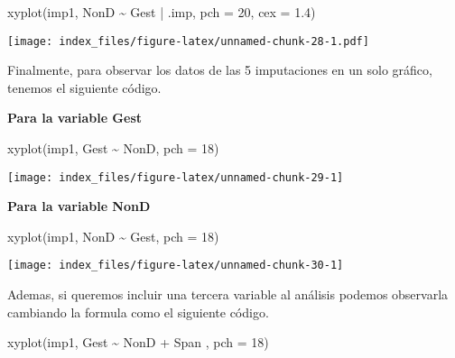 \documentclass[
]{article}
\newenvironment{Shaded}{\begin{snugshade}}{\end{snugshade}}
\newcommand{\AttributeTok}[1]{\textcolor[rgb]{0.77,0.63,0.00}{#1}}
\newcommand{\DecValTok}[1]{\textcolor[rgb]{0.00,0.00,0.81}{#1}}
\newcommand{\FloatTok}[1]{\textcolor[rgb]{0.00,0.00,0.81}{#1}}
\newcommand{\FunctionTok}[1]{\textcolor[rgb]{0.00,0.00,0.00}{#1}}
\newcommand{\NormalTok}[1]{#1}
\newcommand{\SpecialCharTok}[1]{\textcolor[rgb]{0.00,0.00,0.00}{#1}}
\begin{document}
\begin{Shaded}
\begin{Highlighting}[]
\FunctionTok{xyplot}\NormalTok{(imp1, NonD }\SpecialCharTok{\textasciitilde{}}\NormalTok{ Gest }\SpecialCharTok{|}\NormalTok{ .imp, }\AttributeTok{pch =} \DecValTok{20}\NormalTok{, }\AttributeTok{cex =} \FloatTok{1.4}\NormalTok{)}
\end{Highlighting}
\end{Shaded}

\texttt{[image: index\_files/figure-latex/unnamed-chunk-28-1.pdf]}

Finalmente, para observar los datos de las 5 imputaciones en un solo
gráfico, tenemos el siguiente código.

\textbf{Para la variable Gest}

\begin{Shaded}
\begin{Highlighting}[]
\FunctionTok{xyplot}\NormalTok{(imp1, Gest }\SpecialCharTok{\textasciitilde{}}\NormalTok{ NonD, }\AttributeTok{pch =} \DecValTok{18}\NormalTok{)}
\end{Highlighting}
\end{Shaded}

\texttt{[image: index\_files/figure-latex/unnamed-chunk-29-1]}

\textbf{Para la variable NonD}

\begin{Shaded}
\begin{Highlighting}[]
\FunctionTok{xyplot}\NormalTok{(imp1, NonD }\SpecialCharTok{\textasciitilde{}}\NormalTok{ Gest, }\AttributeTok{pch =} \DecValTok{18}\NormalTok{)}
\end{Highlighting}
\end{Shaded}

\texttt{[image: index\_files/figure-latex/unnamed-chunk-30-1]}

Ademas, si queremos incluir una tercera variable al análisis podemos
observarla cambiando la formula como el siguiente código.

\begin{Shaded}
\begin{Highlighting}[]
\FunctionTok{xyplot}\NormalTok{(imp1, Gest }\SpecialCharTok{\textasciitilde{}}\NormalTok{ NonD }\SpecialCharTok{+}\NormalTok{ Span , }\AttributeTok{pch =} \DecValTok{18}\NormalTok{)}
\end{Highlighting}
\end{Shaded}
\end{document}
